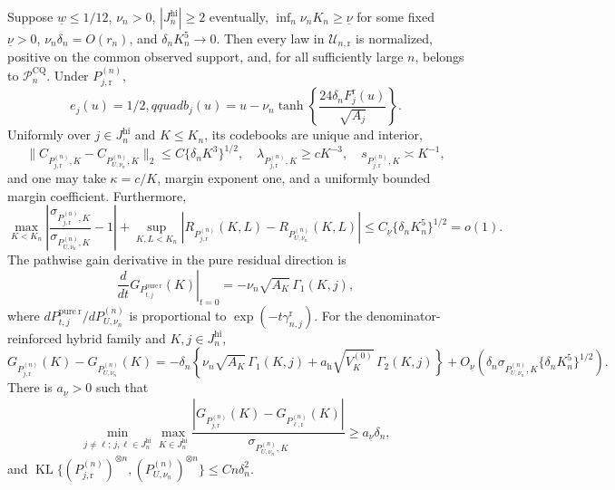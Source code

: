 Suppose \(\underline w\leq1/12\), \(\nu_n>0\), \(|J_n^{\mathrm{hi}}|\geq2\) eventually, \(\inf_n\nu_nK_n\geq\underline\nu\) for some fixed \(\underline\nu>0\), \(\nu_n\delta_n=O(r_n)\), and \(\delta_nK_n^5\to0\).  Then every law in \(\mathcal U_{n,\mathrm r}\) is normalized, positive on the common observed support, and, for all sufficiently large \(n\), belongs to \(\mathcal P_n^{\mathrm{CQ}}\).  Under \(P_{j,\mathrm r}^{(n)}\),
\[
 e_j(u)=1/2,qquad
 b_j(u)=u-\nu_n\tanh\!\left\{\frac{24\delta_nF_{j}^{\mathrm r}(u)}{\sqrt{A_j}}\right\}.
\]
Uniformly over \(j\in J_n^{\mathrm{hi}}\) and \(K\leq K_n\), its codebooks are unique and interior,
\[
 \|C_{P_{j,\mathrm r}^{(n)},K}-C_{P_{U,\nu_n}^{(n)},K}\|_2
 \leq C\{\delta_nK^3\}^{1/2},\quad
 \lambda_{P_{j,\mathrm r}^{(n)},K}\geq cK^{-3},\quad
 s_{P_{j,\mathrm r}^{(n)},K}\asymp K^{-1},
\]
and one may take \(\kappa=c/K\), margin exponent one, and a uniformly bounded margin coefficient.  Furthermore,
\[
 \max_{K<K_n}\left|\frac{\sigma_{P_{j,\mathrm r}^{(n)},K}}
 {\sigma_{P_{U,\nu_n}^{(n)},K}}-1\right|
 +\sup_{K,L<K_n}\left|R_{P_{j,\mathrm r}^{(n)}}(K,L)
 -R_{P_{U,\nu_n}^{(n)}}(K,L)\right|
 \leq C_{\underline\nu}\{\delta_nK_n^5\}^{1/2}=o(1).
\]
The pathwise gain derivative in the pure residual direction is
\[
 \left.\frac{d}{dt}G_{P_{t,j}^{\mathrm{pure\ r}}}(K)\right|_{t=0}
 =-\nu_n\sqrt{A_K}\,\Gamma_1(K,j),
\]
where \(dP_{t,j}^{\mathrm{pure\ r}}/dP_{U,\nu_n}^{(n)}\) is proportional to \(\exp(-t\gamma_{n,j}^{\mathrm r})\).  For the denominator-reinforced hybrid family and \(K,j\in J_n^{\mathrm{hi}}\),
\[
 G_{P_{j,\mathrm r}^{(n)}}(K)-G_{P_{U,\nu_n}^{(n)}}(K)
 =-\delta_n\!\left\{\nu_n\sqrt{A_K}\,\Gamma_1(K,j)
 +a_{\mathrm h}\sqrt{V_K^{(0)}}\,\Gamma_2(K,j)\right\}
 +O_{\underline\nu}\!\left(\delta_n\sigma_{P_{U,\nu_n}^{(n)},K}
 \{\delta_nK_n^5\}^{1/2}\right).
\]
There is \(a_{\underline\nu}>0\) such that
\[
 \min_{j\ne\ell;\,j,\ell\in J_n^{\mathrm{hi}}}\max_{K\in J_n^{\mathrm{hi}}}
 \frac{|G_{P_{j,\mathrm r}^{(n)}}(K)-G_{P_{\ell,\mathrm r}^{(n)}}(K)|}
 {\sigma_{P_{U,\nu_n}^{(n)},K}}
 \geq a_{\underline\nu}\delta_n,
\]
and \(\operatorname{KL}\{(P_{j,\mathrm r}^{(n)})^{\otimes n},(P_{U,\nu_n}^{(n)})^{\otimes n}\}\leq Cn\delta_n^2\).